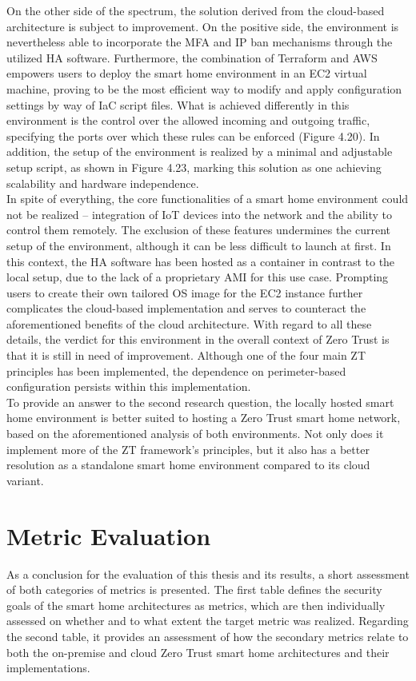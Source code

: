 On the other side of the spectrum, the solution derived from the cloud-based architecture is subject to improvement. On the positive side, the environment is nevertheless able to incorporate the MFA and IP ban mechanisms through the utilized HA software. Furthermore, the combination of Terraform and AWS empowers users to deploy the smart home environment in an EC2 virtual machine, proving to be the most efficient way to modify and apply configuration settings by way of IaC script files. What is achieved differently in this environment is the control over the allowed incoming and outgoing traffic, specifying the ports over which these rules can be enforced (Figure 4.20). In addition, the setup of the environment is realized by a minimal and adjustable setup script, as shown in Figure 4.23, marking this solution as one achieving scalability and hardware independence.\\
In spite of everything, the core functionalities of a smart home environment could not be realized -- integration of IoT devices into the network and the ability to control them remotely. The exclusion of these features undermines the current setup of the environment, although it can be less difficult to launch at first. In this context, the HA software has been hosted as a container in contrast to the local setup, due to the lack of a proprietary AMI for this use case. Prompting users to create their own tailored OS image for the EC2 instance further complicates the cloud-based implementation and serves to counteract the aforementioned benefits of the cloud architecture. With regard to all these details, the verdict for this environment in the overall context of Zero Trust is that it is still in need of improvement. Although one of the four main ZT principles has been implemented, the dependence on perimeter-based configuration persists within this implementation.\\
To provide an answer to the second research question, the locally hosted smart home environment is better suited to hosting a Zero Trust smart home network, based on the aforementioned analysis of both environments. Not only does it implement more of the ZT framework's principles, but it also has a better resolution as a standalone smart home environment compared to its cloud variant.

\section{Metric Evaluation} 
As a conclusion for the evaluation of this thesis and its results, a short assessment of both categories of metrics is presented. The first table defines the security goals of the smart home architectures as metrics, which are then individually assessed on whether and to what extent the target metric was realized. Regarding the second table, it provides an assessment of how the secondary metrics relate to both the on-premise and cloud Zero Trust smart home architectures and their implementations. 

